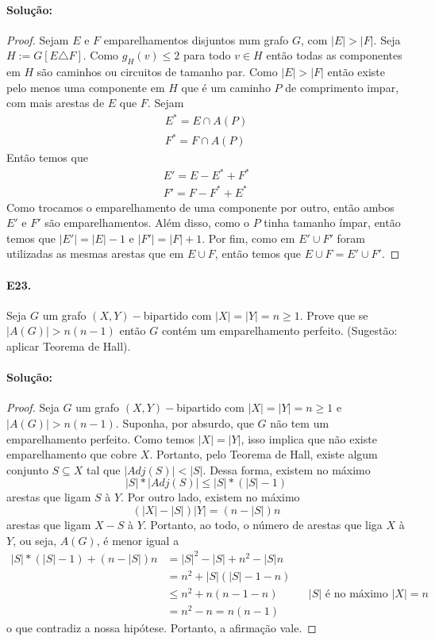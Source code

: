 \documentclass[11pt,a4paper,notitlepage]{exam}
\begin{document}
\paragraph*{Solução:}
\begin{proof}
 Sejam $E$ e $F$ emparelhamentos disjuntos num grafo $G$,
    com $|E| > |F|$. Seja $H := G[E\triangle F]$. Como $g_H(v) \leq 2$
    para todo $v \in H$ então todas as componentes em $H$ são caminhos
    ou circuitos de tamanho par. Como $|E| > |F|$ então existe pelo
    menos uma componente em $H$ que é um caminho $P$ de comprimento
    impar, com mais arestas de $E$ que $F$. Sejam
    \begin{align*}
        E^{*} = E \cap A(P)\\
        F^{*} = F \cap A(P)
    \end{align*}
    Então temos que
    \begin{align*}
        E' = E - E^{*} + F^{*}\\
        F' = F - F^{*} + E^{*}
    \end{align*}
    Como trocamos o emparelhamento de uma componente por outro, então ambos $E'$
    e $F'$ são emparelhamentos. Além disso, como o $P$ tinha tamanho
    ímpar, então temos que $|E'| = |E| - 1$ e $|F'| = |F| + 1$. Por fim,
    como em $E'\cup F'$ foram utilizadas as mesmas arestas que em $E
    \cup F$, então temos que $E \cup F = E' \cup F'$.
\end{proof}
\paragraph*{E23. } Seja $G$ um grafo $(X, Y)-$bipartido com $|X| =
|Y| = n \geq 1$. Prove que se $|A(G)| > n(n-1)$ então $G$ contém
um emparelhamento perfeito. (Sugestão: aplicar Teorema de Hall).
\paragraph*{Solução: }
\begin{proof}
     Seja $G$ um grafo $(X, Y)-$bipartido com $|X| =
    |Y| = n \geq 1$ e $|A(G)| > n(n-1)$. Suponha, por absurdo, que $G$ não tem um emparelhamento
perfeito. Como temos $|X| = |Y|$, isso implica que não existe
    emparelhamento que cobre $X$. Portanto, pelo Teorema de Hall, existe
    algum conjunto $S \subseteq X$ tal que $|Adj(S)| < |S|$. Dessa forma,
    existem no máximo $$|S|*|Adj(S)| \leq |S|*(|S|-1)$$ arestas que ligam $S$ à
    $Y$. Por outro lado, existem no máximo $$(|X|-|S|)|Y| =
    (n-|S|)n$$ arestas que ligam $X-S$ à $Y$. Portanto, ao todo, o
    número de arestas que liga $X$ à $Y$, ou seja, $A(G)$, é menor igual a
    \begin{align*}
        |S|*(|S|-1) + (n-|S|)n &= |S|^2 - |S| + n^2 -|S|n\\
        &=n^2 + |S|(|S| -1 -n)\\
        &\leq n^2 + n(n -1 -n) && \text{$|S|$ é no máximo $|X|=n$}\\
        &= n^2 -n = n(n-1)
    \end{align*}
    o que contradiz a nossa hipótese. Portanto, a afirmação vale.
\end{proof}
\end{document}
